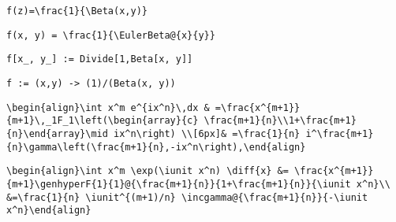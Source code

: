\newsavebox\ART
\begin{lrbox}{\ART}
 \begin{minipage}[t]{0.82\textwidth}
  \lstinline[language={[latex]TeX},mathescape,breaklines=true]"f(z)=\frac{1}{\Beta(x,y)}"
 \end{minipage}
\end{lrbox}
\newsavebox\ARST
\begin{lrbox}{\ARST}
 \begin{minipage}[t]{0.82\textwidth}
  \lstinline[language={[latex]TeX},mathescape,breaklines=true]"f(x, y) = \frac{1}{\EulerBeta@{x}{y}}"
 \end{minipage}
\end{lrbox}
\newsavebox\ARMM
\begin{lrbox}{\ARMM}
 \begin{minipage}[t]{0.82\textwidth}
  \lstinline[language={[latex]TeX},mathescape,breaklines=true]"f[x_, y_] := Divide[1,Beta[x, y]]"
 \end{minipage}
\end{lrbox}
\newsavebox\ARMA
\begin{lrbox}{\ARMA}
 \begin{minipage}[t]{0.82\textwidth}
  \lstinline[language={[latex]TeX},mathescape,breaklines=true]"f := (x,y) -> (1)/(Beta(x, y))"
 \end{minipage}
\end{lrbox}
\newsavebox\AST
\begin{lrbox}{\AST}
 \begin{minipage}[t]{0.82\textwidth}
  \lstinline[language={[latex]TeX},mathescape,breaklines=true]"\begin{align}\int x^m e^{ix^n}\,dx & =\frac{x^{m+1}}{m+1}\,_1F_1\left(\begin{array}{c} \frac{m+1}{n}\\1+\frac{m+1}{n}\end{array}\mid ix^n\right) \\[6px]& =\frac{1}{n} i^\frac{m+1}{n}\gamma\left(\frac{m+1}{n},-ix^n\right),\end{align}"
 \end{minipage}
\end{lrbox}
\newsavebox\ASST
\begin{lrbox}{\ASST}
 \begin{minipage}[t]{0.82\textwidth}
  \lstinline[language={[latex]TeX},mathescape,breaklines=true]"\begin{align}\int x^m \exp(\iunit x^n) \diff{x} &= \frac{x^{m+1}}{m+1}\genhyperF{1}{1}@{\frac{m+1}{n}}{1+\frac{m+1}{n}}{\iunit x^n}\\ &=\frac{1}{n} \iunit^{(m+1)/n} \incgamma@{\frac{m+1}{n}}{-\iunit x^n}\end{align}"
 \end{minipage}
\end{lrbox}
